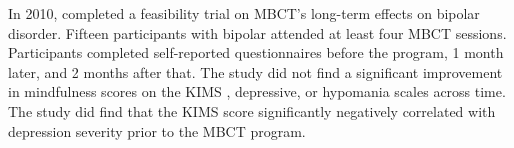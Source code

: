 In 2010, \cite{weber_mindfulness-based_2010} completed a feasibility trial on MBCT’s long-term effects on bipolar disorder. Fifteen participants with bipolar attended at least four MBCT sessions. Participants completed self-reported questionnaires before the program, 1 month later, and 2 months after that. The study did not find a significant improvement in mindfulness scores on the KIMS \cite{baer_assessment_2004}, depressive, or hypomania scales across time. The study did find that the KIMS score significantly negatively correlated with depression severity prior to the MBCT program.
  